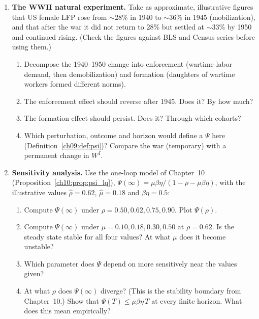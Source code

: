 \documentclass[../structural_economics_book.tex]{subfiles}
\begin{document}
\begin{enumerate}[label=\textbf{11.\arabic*}, leftmargin=3em]
\item \textbf{The WWII natural experiment.} Take as approximate, illustrative figures that US female LFP rose from $\sim$28\% in 1940 to $\sim$36\% in 1945 (mobilization), and that after the war it did not return to 28\% but settled at $\sim$33\% by 1950 and continued rising. (Check the figures against BLS and Census series before using them.)
\begin{enumerate}
\item Decompose the 1940--1950 change into enforcement (wartime labor demand, then demobilization) and formation (daughters of wartime workers formed different norms).
\item The enforcement effect should reverse after 1945. Does it? By how much?
\item The formation effect should persist. Does it? Through which cohorts?
\item Which perturbation, outcome and horizon would define a $\Psi$ here (Definition~\ref{ch09:def:psi})? Compare the war (temporary) with a permanent change in $W^I$.
\end{enumerate}

\item \textbf{Sensitivity analysis.} Use the one-loop model of Chapter~10 (Proposition~\ref{ch10:prop:psi_lq}), $\Psi(\infty) = \mu\beta\eta/(1 - \rho - \mu\beta\eta)$, with the illustrative values $\hat{\rho} = 0.62$, $\hat{\mu} = 0.18$ and $\beta\eta = 0.5$:
\begin{enumerate}
\item Compute $\Psi(\infty)$ under $\rho = 0.50, 0.62, 0.75, 0.90$. Plot $\Psi(\rho)$.
\item Compute $\Psi(\infty)$ under $\mu = 0.10, 0.18, 0.30, 0.50$ at $\rho = 0.62$. Is the steady state stable for all four values? At what $\mu$ does it become unstable?
\item Which parameter does $\Psi$ depend on more sensitively near the values given?
\item At what $\rho$ does $\Psi(\infty)$ diverge? (This is the stability boundary from Chapter~10.) Show that $\Psi(T) \le \mu\beta\eta\,T$ at every finite horizon. What does this mean empirically?
\end{enumerate}


\end{enumerate}
\end{document}
